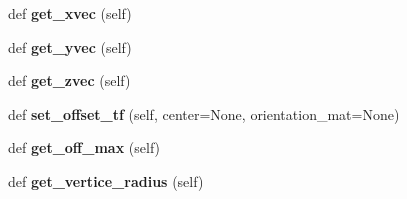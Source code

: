 \begin{DoxyCompactItemize}
def {\bfseries get\+\_\+xvec} (self)
\item 
\mbox{\label{classrnb-planning_1_1src_1_1pkg_1_1geometry_1_1geometry_1_1_geometry_item_a4145a57fc5043bff895f7f299fec5670}} 
def {\bfseries get\+\_\+yvec} (self)
\item 
\mbox{\label{classrnb-planning_1_1src_1_1pkg_1_1geometry_1_1geometry_1_1_geometry_item_a01cd9e136c9522d6c06a4237eadfbf6a}} 
def {\bfseries get\+\_\+zvec} (self)
\item 
\mbox{\label{classrnb-planning_1_1src_1_1pkg_1_1geometry_1_1geometry_1_1_geometry_item_ac7423bee31df08ff39d73fa1ba27b8d7}} 
def {\bfseries set\+\_\+offset\+\_\+tf} (self, center=None, orientation\+\_\+mat=None)
\item 
\mbox{\label{classrnb-planning_1_1src_1_1pkg_1_1geometry_1_1geometry_1_1_geometry_item_a4dd036c1eeb24afdc8b1e83c9a95332d}} 
def {\bfseries get\+\_\+off\+\_\+max} (self)
\item 
\mbox{\label{classrnb-planning_1_1src_1_1pkg_1_1geometry_1_1geometry_1_1_geometry_item_a7d5a4776320a7e3bbf47d4354b6d4fbb}} 
def {\bfseries get\+\_\+vertice\+\_\+radius} (self)
\end{DoxyCompactItemize}
